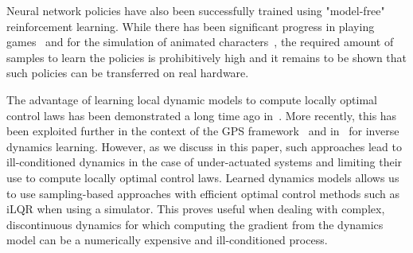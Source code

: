 Neural network policies have also been successfully trained using "model-free" reinforcement learning. While there has been significant progress in playing games~\cite{mnih2015human,silver2016mastering,silver2017mastering} and for the simulation of animated characters~\cite{heess2017emergence}, the required amount of samples to learn the policies is prohibitively high and it remains to be shown that such policies can be transferred on real hardware.

The advantage of learning local dynamic models to compute locally optimal control laws has been demonstrated a long time ago in~\cite{schaal94}. More recently, this has been exploited further in the context of the GPS framework~\cite{levine2015learning} and in~\cite{meier16} for inverse dynamics learning.
However, as we discuss in this paper, such approaches lead to ill-conditioned dynamics in the case of under-actuated systems and limiting their use to compute locally optimal control laws.
Learned dynamics models allows us to use sampling-based approaches with efficient optimal control methods such as iLQR when using a simulator. This proves useful when dealing with complex, discontinuous dynamics for which computing the gradient from the dynamics model can be a numerically expensive and ill-conditioned process.

